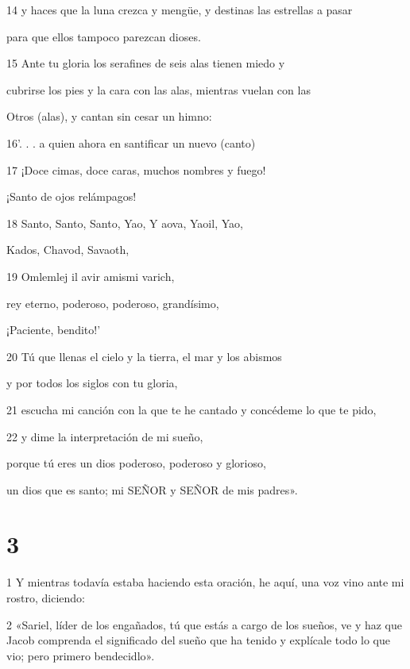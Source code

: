 \par 14 y haces que la luna crezca y mengüe, y destinas las estrellas a pasar
\par para que ellos tampoco parezcan dioses.

\par 15 Ante tu gloria los serafines de seis alas tienen miedo y
\par cubrirse los pies y la cara con las alas, mientras vuelan con las
\par Otros (alas), y cantan sin cesar un himno:

\par 16'. . . a quien ahora en santificar un nuevo (canto)

\par 17 ¡Doce cimas, doce caras, muchos nombres y fuego!
\par ¡Santo de ojos relámpagos!

\par 18 Santo, Santo, Santo, Yao, Y aova, Yaoil, Yao,
\par Kados, Chavod, Savaoth,

\par 19 Omlemlej il avir amismi varich,
\par rey eterno, poderoso, poderoso, grandísimo,
\par ¡Paciente, bendito!'

\par 20 Tú que llenas el cielo y la tierra, el mar y los abismos
\par y por todos los siglos con tu gloria,

\par 21 escucha mi canción con la que te he cantado y concédeme lo que te pido,

\par 22 y dime la interpretación de mi sueño,
\par porque tú eres un dios poderoso, poderoso y glorioso,
\par un dios que es santo; mi SEÑOR y SEÑOR de mis padres».

\chapter{3}


\par 1 Y mientras todavía estaba haciendo esta oración, he aquí, una voz vino ante mi rostro, diciendo:

\par 2 «Sariel, líder de los engañados, tú que estás a cargo de los sueños, ve y haz que Jacob comprenda el significado del sueño que ha tenido y explícale todo lo que vio; pero primero bendecidlo».

